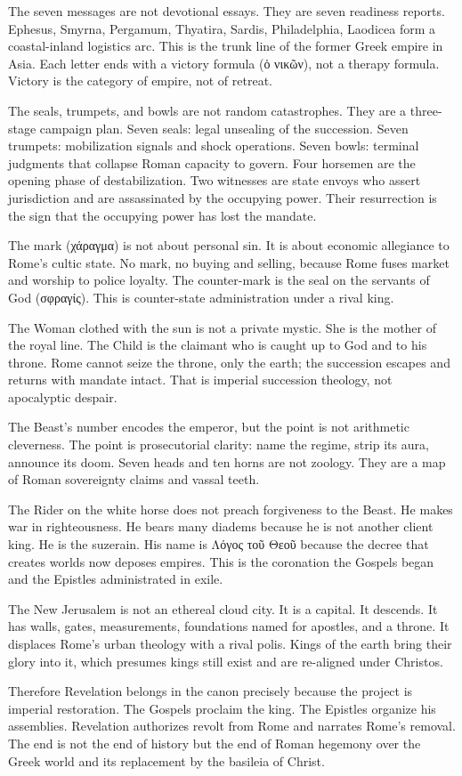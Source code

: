 The seven messages are not devotional essays.
They are seven readiness reports.
Ephesus, Smyrna, Pergamum, Thyatira, Sardis, Philadelphia, Laodicea form a coastal-inland logistics arc.
This is the trunk line of the former Greek empire in Asia.
Each letter ends with a victory formula (ὁ νικῶν), not a therapy formula.
Victory is the category of empire, not of retreat.

The seals, trumpets, and bowls are not random catastrophes.
They are a three-stage campaign plan.
Seven seals: legal unsealing of the succession.
Seven trumpets: mobilization signals and shock operations.
Seven bowls: terminal judgments that collapse Roman capacity to govern.
Four horsemen are the opening phase of destabilization.
Two witnesses are state envoys who assert jurisdiction and are assassinated by the occupying power.
Their resurrection is the sign that the occupying power has lost the mandate.

The mark (χάραγμα) is not about personal sin.
It is about economic allegiance to Rome’s cultic state.
No mark, no buying and selling, because Rome fuses market and worship to police loyalty.
The counter-mark is the seal on the servants of God (σφραγίς).
This is counter-state administration under a rival king.

The Woman clothed with the sun is not a private mystic.
She is the mother of the royal line.
The Child is the claimant who is caught up to God and to his throne.
Rome cannot seize the throne, only the earth; the succession escapes and returns with mandate intact.
That is imperial succession theology, not apocalyptic despair.

The Beast’s number encodes the emperor, but the point is not arithmetic cleverness.
The point is prosecutorial clarity: name the regime, strip its aura, announce its doom.
Seven heads and ten horns are not zoology.
They are a map of Roman sovereignty claims and vassal teeth.

The Rider on the white horse does not preach forgiveness to the Beast.
He makes war in righteousness.
He bears many diadems because he is not another client king.
He is the suzerain.
His name is Λόγος τοῦ Θεοῦ because the decree that creates worlds now deposes empires.
This is the coronation the Gospels began and the Epistles administrated in exile.

The New Jerusalem is not an ethereal cloud city.
It is a capital.
It descends.
It has walls, gates, measurements, foundations named for apostles, and a throne.
It displaces Rome’s urban theology with a rival polis.
Kings of the earth bring their glory into it, which presumes kings still exist and are re-aligned under Christos.

Therefore Revelation belongs in the canon precisely because the project is imperial restoration.
The Gospels proclaim the king.
The Epistles organize his assemblies.
Revelation authorizes revolt from Rome and narrates Rome’s removal.
The end is not the end of history but the end of Roman hegemony over the Greek world and its replacement by the basileia of Christ.
